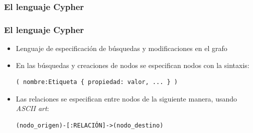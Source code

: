 \documentclass[14pt]{beamer}
\begin{document}





\subsubsection{El lenguaje Cypher}

\begin{frame}[fragile]
  \frametitle{El lenguaje Cypher}
  \begin{itemize}
\item Lenguaje de especificación de búsquedas y modificaciones en el
  grafo
\item En las búsquedas y creaciones de nodos se especifican nodos con la
  sintaxis:
\begin{lstlisting}[language=cypher]
( nombre:Etiqueta { propiedad: valor, ... } )
\end{lstlisting}

\item Las relaciones se especifican entre nodos de la siguiente manera,
  usando {\em ASCII art}:

\begin{lstlisting}[language=cypher]
(nodo_origen)-[:RELACIÓN]->(nodo_destino)
\end{lstlisting}
  \end{itemize}
\end{frame}
\end{document}
